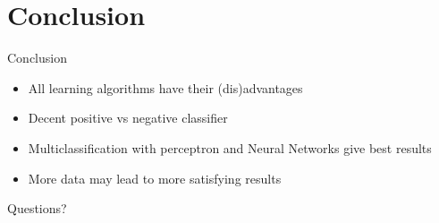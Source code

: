 \documentclass{beamer}
\begin{document}

\section{Conclusion}
\begin{frame}{Conclusion}
\begin{itemize}
\item All learning algorithms have their (dis)advantages
\item Decent positive vs negative classifier
\item Multiclassification with perceptron and Neural Networks give best results
\item More data may lead to more satisfying results
\end{itemize}
\end{frame}
\begin{frame}{Questions?}
\end{frame}
\end{document}
